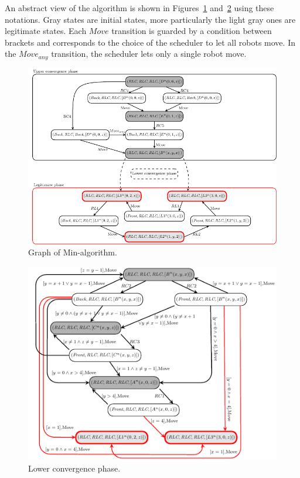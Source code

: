 
An abstract view of the algorithm is shown in Figures~\ref{fig:all}
and~\ref{fig:lower} using these notations. Gray states are
initial states, more particularly the light gray ones are legitimate states.  Each
$\textit{Move}$ transition is guarded by a condition between brackets
and corresponds to the choice of the scheduler to let all robots
move. In the $\textit{Move}_{any}$ transition, the scheduler lets only
a single robot move.


\begin{figure}[htbp]
\centering
%
\includegraphics[scale=1.2]{figures/figALgoMin2}
\caption{Graph of Min-algorithm.}
 \label{fig:all}
\end{figure}

\begin{figure}[htbp]
\centering
\includegraphics[scale=2]{figures/figlowerP}
\caption{Lower convergence phase.}
 \label{fig:lower}
\end{figure}

